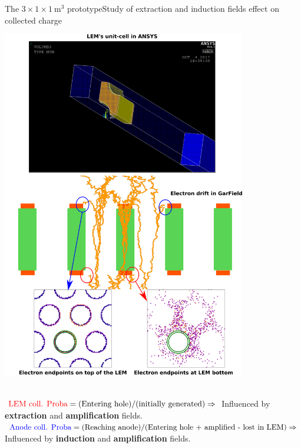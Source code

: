 \documentclass[10pt]{beamer}
\begin{document}
\begin{frame}{The \texorpdfstring{$3 \times 1 \times \SI{1}{\meter\cubed}$}{311} prototype}{Study of extraction and induction fields effect on collected charge}
\begin{scriptsize}
\begin{minipage}{0.48\textwidth}
    			\includegraphics[width=0.8\textwidth]{figures/311/coll_proba.png}\\
    		\end{minipage}\\
    		\vspace{0.2cm}
    		$\textcolor{red}{\text{LEM coll. Proba}}=\text{(Entering hole)}/\text{(initially generated)} \Rightarrow$ Influenced by \textbf{extraction} and \textbf{amplification} fields. \\
    		$\textcolor{blue}{\text{Anode coll. Proba}}=\text{(Reaching anode)}/\text{(Entering hole + amplified - lost in LEM)}\Rightarrow$ Influenced by \textbf{induction} and \textbf{amplification} fields.
    	\end{scriptsize} 
    \end{frame}
    
\end{document}
